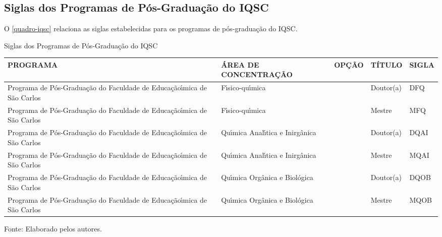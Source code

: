 \begin{apendicesenv}
\chapter{Siglas dos Programas de P\'os-Gradua\c{c}\~ao do IQSC}
O \autoref{quadro-iqsc} relaciona as siglas estabelecidas para os programas de p\'os-gradua\c{c}\~ao do IQSC.
\begin{quadro}[Htb]
\ABNTEXfontereduzida
\caption[Siglas dos Programas de P\'os-Gradua\c{c}\~ao do IQSC]{Siglas dos Programas de P\'os-Gradua\c{c}\~ao do IQSC}
\label{quadro-iqsc}
\begin{tabular}{|p{3.5cm}|p{3.5cm}|p{3.5cm}|p{1.5cm}|p{2.25cm}|}
  \hline
   \textbf{PROGRAMA} & \textbf{\'AREA DE CONCENTRA\c{C}\~AO} & \textbf{OP\c{C}\~AO} & \textbf{T\'ITULO} & \textbf{SIGLA}  \\
    \hline
Programa de P\'os-Gradua\c{c}\~ao do Faculdade de Educa\c{c}\~ao\'{\i}mica de S\~ao Carlos & F\'{\i}sico-qu\'{\i}mica &  & Doutor(a) & DFQ\\
Programa de P\'os-Gradua\c{c}\~ao do Faculdade de Educa\c{c}\~ao\'{\i}mica de S\~ao Carlos & F\'{\i}sico-qu\'{\i}mica &  & Mestre & MFQ\\
Programa de P\'os-Gradua\c{c}\~ao do Faculdade de Educa\c{c}\~ao\'{\i}mica de S\~ao Carlos & Qu\'{\i}mica Anal\'{\i}tica e Inirg\^anica &  & Doutor(a) & DQAI\\
Programa de P\'os-Gradua\c{c}\~ao do Faculdade de Educa\c{c}\~ao\'{\i}mica de S\~ao Carlos & Qu\'{\i}mica Anal\'{\i}tica e Inirg\^anica &  & Mestre & MQAI\\
Programa de P\'os-Gradua\c{c}\~ao do Faculdade de Educa\c{c}\~ao\'{\i}mica de S\~ao Carlos & Qu\'{\i}mica Org\^anica e Biol\'ogica &  & Doutor(a) & DQOB\\
Programa de P\'os-Gradua\c{c}\~ao do Faculdade de Educa\c{c}\~ao\'{\i}mica de S\~ao Carlos & Qu\'{\i}mica Org\^anica e Biol\'ogica &  & Mestre & MQOB\\
\hline

\end{tabular}
\begin{flushleft}
		Fonte: Elaborado pelos autores.\
\end{flushleft}
\end{quadro}


\end{apendicesenv}
